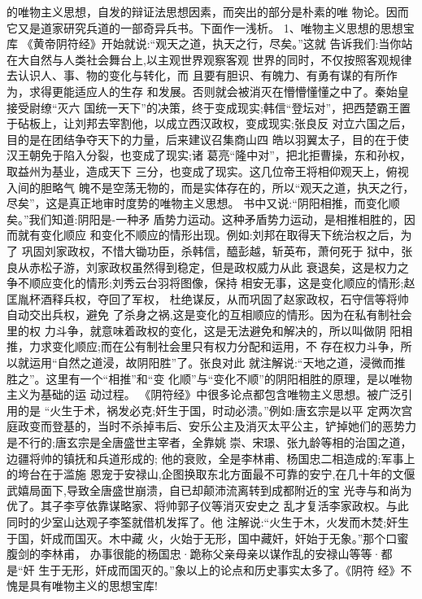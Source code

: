 \documentclass[12pt,UTF8]{ctexbook}
\begin{document}
的唯物主义思想，自发的辩证法思想因素，而突出的部分是朴素的唯
物论。因而它又是道家研究兵道的一部奇异兵书。下面作一浅析。
1、唯物主义思想的思想宝库
《黄帝阴符经》开始就说:“观天之道，执天之行，尽矣。”这就
告诉我们:当你站在大自然与人类社会舞台上,以主观世界观察客观
世界的同时，不仅按照客观规律去认识人、事、物的变化与转化，而
且要有胆识、有魄力、有勇有谋的有所作为，求得更能适应人的生存
和发展。否则就会被消灭在懵懵懂懂之中了。秦始皇接受尉缭“灭六
国统一天下”的决策，终于变成现实;韩信“登坛对”，把西楚霸王置于砧板上，让刘邦去宰割他，以成立西汉政权，变成现实;张良反
对立六国之后，目的是在团结争夺天下的力量，后来建议召集商山四
皓以羽翼太子，目的在于使汉王朝免于陷入分裂，也变成了现实;诸
葛亮“隆中对”，把北拒曹操，东和孙权，取益州为基业，造成天下
三分，也变成了现实。这几位帝王将相仰观天上，俯视入间的胆略气
魄不是空荡无物的，而是实体存在的，所以“观天之道，执天之行，
尽矣”，这是真正地审时度势的唯物主义思想。
书中又说:“阴阳相推，而变化顺矣。”我们知道:阴阳是-一种矛
盾势力运动。这种矛盾势力运动，是相推相胜的，因而就有变化顺应
和变化不顺应的情形出现。例如:刘邦在取得天下统治权之后，为了
巩固刘家政权，不惜大锄功臣，杀韩信，醯彭越，斩英布，萧何死于
狱中，张良从赤松子游，刘家政权虽然得到稳定，但是政权威力从此
衰退矣，这是权力之争不顺应变化的情形;刘秀云台羽将图像，保持
相安无事，这是变化顺应的情形;赵匡胤杯酒释兵权，夺回了军权，
杜绝谋反，从而巩固了赵家政权，石守信等将帅自动交出兵权，避免
了杀身之祸,这是变化的互相顺应的情形。因为在私有制社会里的权
力斗争，就意味着政权的变化，这是无法避免和解决的，所以叫做阴
阳相推，力求变化顺应;而在公有制社会里只有权力分配和运用，不
存在权力斗争，所以就运用“自然之道浸，故阴阳胜”了。张良对此
就注解说:“天地之道，浸微而推胜之”。这里有一个“相推”和“变
化顺”与“变化不顺”的阴阳相胜的原理，是以唯物主义为基础的运
动过程。
《阴符经》中很多论点都包含唯物主义思想。被广泛引用的是
“火生于术，祸发必克;奸生于国，时动必溃。”例如:唐玄宗是以平
定两次宫庭政变而登基的，当时不杀掉韦后、安乐公主及消灭太平公主，铲掉她们的恶势力是不行的;唐玄宗是全唐盛世主宰者，全靠姚
崇、宋璟、张九龄等相的治国之道，边疆将帅的镇抚和兵道形成的;
他的衰败，全是李林甫、杨国忠二相造成的;军事上的垮台在于滥施
恩宠于安禄山,企图换取东北方面最不可靠的安宁,在几十年的文偃
武嬉局面下,导致全唐盛世崩溃，自已却颠沛流离转到成都附近的宝
光寺与和尚为优了。其子李亨依靠谋略家、将帅郭子仪等消灭安史之
乱才复活李家政权。与此同时的少室山达观子李筌就借机发挥了。他
注解说:“火生于木，火发而木焚;奸生于国，奸成而国灭。木中藏
火，火始于无形，国中藏奸，奸始于无象。”那个口蜜腹剑的李林甫，
办事很能的杨国忠·跪称父亲母亲以谋作乱的安禄山等等·都是“奸
生于无形，奸成而国灭的。”象以上的论点和历史事实太多了。《阴符
经》不愧是具有唯物主义的思想宝库!
\end{document}
